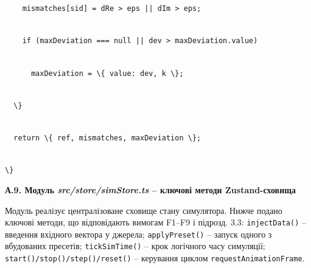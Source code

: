 \documentclass[
]{article}
\newcommand{\passthrough}[1]{#1}
\begin{document}
\passthrough{\lstinline!    !}\passthrough{\lstinline!mismatches[!}\passthrough{\lstinline!sid!}\passthrough{\lstinline!]!}\passthrough{\lstinline! !}\passthrough{\lstinline!=!}\passthrough{\lstinline! !}\passthrough{\lstinline!dRe!}\passthrough{\lstinline! !}\passthrough{\lstinline!>!}\passthrough{\lstinline! !}\passthrough{\lstinline!eps!}\passthrough{\lstinline! !}\passthrough{\lstinline!||!}\passthrough{\lstinline! !}\passthrough{\lstinline!dIm!}\passthrough{\lstinline! !}\passthrough{\lstinline!>!}\passthrough{\lstinline! !}\passthrough{\lstinline!eps;!}\strut \\
\passthrough{\lstinline!    !}\passthrough{\lstinline!if!}\passthrough{\lstinline! !}\passthrough{\lstinline!(!}\passthrough{\lstinline!maxDeviation!}\passthrough{\lstinline! !}\passthrough{\lstinline!===!}\passthrough{\lstinline! !}\passthrough{\lstinline!null!}\passthrough{\lstinline! !}\passthrough{\lstinline!||!}\passthrough{\lstinline! !}\passthrough{\lstinline!dev!}\passthrough{\lstinline! !}\passthrough{\lstinline!>!}\passthrough{\lstinline! !}\passthrough{\lstinline!maxDeviation.value!}\passthrough{\lstinline!)!}\strut \\
\passthrough{\lstinline!      !}\passthrough{\lstinline!maxDeviation!}\passthrough{\lstinline! !}\passthrough{\lstinline!=!}\passthrough{\lstinline! !}\passthrough{\lstinline!\{!}\passthrough{\lstinline! !}\passthrough{\lstinline!value:!}\passthrough{\lstinline! !}\passthrough{\lstinline!dev,!}\passthrough{\lstinline! !}\passthrough{\lstinline!k!}\passthrough{\lstinline! !}\passthrough{\lstinline!\};!}\strut \\
\passthrough{\lstinline!  !}\passthrough{\lstinline!\}!}\strut \\
\passthrough{\lstinline!  !}\passthrough{\lstinline!return!}\passthrough{\lstinline! !}\passthrough{\lstinline!\{!}\passthrough{\lstinline! !}\passthrough{\lstinline!ref,!}\passthrough{\lstinline! !}\passthrough{\lstinline!mismatches,!}\passthrough{\lstinline! !}\passthrough{\lstinline!maxDeviation!}\passthrough{\lstinline! !}\passthrough{\lstinline!\};!}\strut \\
\passthrough{\lstinline!\}!}

\textbf{А.9. Модуль \emph{src/store/simStore.ts} -- ключові методи
Zustand-сховища}

Модуль реалізує централізоване сховище стану симулятора. Нижче подано
ключові методи, що відповідають вимогам F1--F9 і підрозд. 3.3:
\passthrough{\lstinline!injectData!}\passthrough{\lstinline!()!} --
введення вхідного вектора у джерела;
\passthrough{\lstinline!applyPreset!}\passthrough{\lstinline!()!} --
запуск одного з вбудованих пресетів;
\passthrough{\lstinline!tickSimTime!}\passthrough{\lstinline!()!} --
крок логічного часу симуляції;
\passthrough{\lstinline!start!}\passthrough{\lstinline!()/!}\passthrough{\lstinline!stop!}\passthrough{\lstinline!()/!}\passthrough{\lstinline!step!}\passthrough{\lstinline!()/!}\passthrough{\lstinline!reset!}\passthrough{\lstinline!()!}
-- керування циклом \passthrough{\lstinline!requestAnimationFrame!}.
\end{document}
